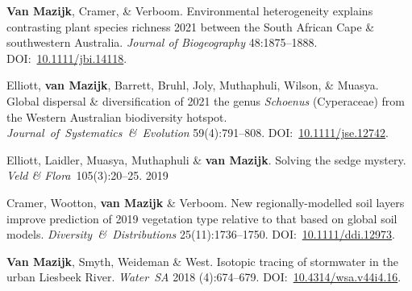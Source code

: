\begin{hangparas}{2em}{1}

\textbf{Van Mazijk}, Cramer, \& Verboom.
Environmental heterogeneity explains contrasting plant species richness
                                                              \hfill 2021 \break
between the South African Cape \& southwestern Australia.
\textit{Journal of Biogeography}
48:1875--1888.                                                            \break
DOI:~\href{https://doi.org/10.1111/jbi.14118}{10.1111/jbi.14118}.

Elliott, \textbf{van Mazijk}, Barrett, Bruhl,
Joly, Muthaphuli, Wilson, \& Muasya.
Global dispersal \& diversification of                        \hfill 2021 \break
the genus \textit{Schoenus} (Cyperaceae)
from the Western Australian biodiversity hotspot.                         \break
\textit{Journal~of~Systematics~\&~Evolution}
59(4):791--808.
DOI:~\href{https://doi.org/10.1111/jse.1274}{10.1111/jse.12742}.

Elliott, Laidler, Muasya, Muthaphuli \& \textbf{van Mazijk}.
Solving the sedge mystery.
\textit{Veld \& Flora}~105(3):20--25.                         \hfill 2019

Cramer, Wootton, \textbf{van Mazijk} \& Verboom.
New regionally-modelled soil layers improve prediction of     \hfill 2019 \break
vegetation type relative to that based on global soil models.
\textit{Diversity~\&~Distributions}
25(11):1736--1750.                                                        \break
DOI:~\href{https://doi.org/10.1111/ddi.12973}{10.1111/ddi.12973}.

\textbf{Van Mazijk}, Smyth, Weideman \& West.
Isotopic tracing of stormwater in the urban Liesbeek River.
\textit{Water~SA}                                             \hfill 2018 (4):674--679.
DOI:~\href{https://doi.org/10.4314/wsa.v44i4.16}{10.4314/wsa.v44i4.16}.

\end{hangparas}
